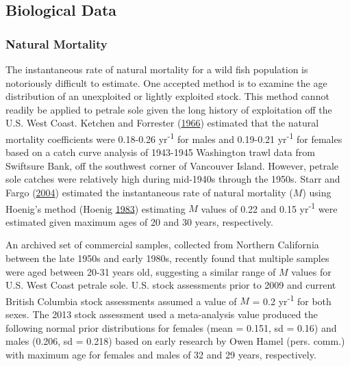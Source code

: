 \documentclass[12pt,]{article}
\begin{document}
\subsection{Biological Data}\label{biological-data}

\subsubsection{Natural Mortality}\label{natural-mortality}

The instantaneous rate of natural mortality for a wild fish population
is notoriously difficult to estimate. One accepted method is to examine
the age distribution of an unexploited or lightly exploited stock. This
method cannot readily be applied to petrale sole given the long history
of exploitation off the U.S. West Coast. Ketchen and Forrester
(\protect\hyperlink{ref-ketchen_population_1966}{1966}) estimated that
the natural mortality coefficients were 0.18-0.26 yr\textsuperscript{-1}
for males and 0.19-0.21 yr\textsuperscript{-1} for females based on a
catch curve analysis of 1943-1945 Washington trawl data from Swiftsure
Bank, off the southwest corner of Vancouver Island. However, petrale
sole catches were relatively high during mid-1940s through the 1950s.
Starr and Fargo (\protect\hyperlink{ref-starr_petrale_2004}{2004})
estimated the instantaneous rate of natural mortality (\(M\)) using
Hoenig's method (Hoenig
\protect\hyperlink{ref-hoenig_empirical_1983}{1983}) estimating \(M\)
values of 0.22 and 0.15 yr\textsuperscript{-1} were estimated given
maximum ages of 20 and 30 years, respectively.

An archived set of commercial samples, collected from Northern
California between the late 1950s and early 1980s, recently found that
multiple samples were aged between 20-31 years old, suggesting a similar
range of \(M\) values for U.S. West Coast petrale sole. U.S. stock
assessments prior to 2009 and current British Columbia stock assessments
assumed a value of \(M\) = 0.2 yr\textsuperscript{-1} for both sexes.
The 2013 stock assessment used a meta-analysis value produced the
following normal prior distributions for females (mean = 0.151, sd =
0.16) and males (0.206, sd = 0.218) based on early research by Owen
Hamel (pers. comm.) with maximum age for females and males of 32 and 29
years, respectively.
\end{document}
